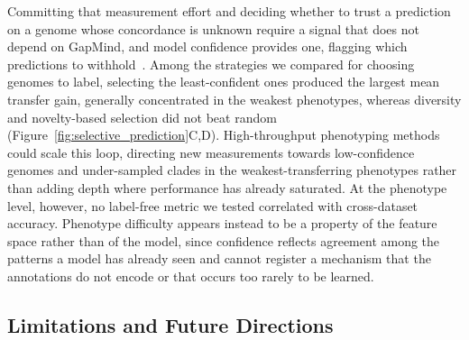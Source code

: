 Committing that measurement effort and deciding whether to trust a prediction on a genome whose concordance is unknown require a signal that does not depend on GapMind, and model confidence provides one, flagging which predictions to withhold~\cite{Weaver2008AppDomain,Geifman2017SelectiveClassification,Hendrickx2024Reject}.
Among the strategies we compared for choosing genomes to label, selecting the least-confident ones produced the largest mean transfer gain, generally concentrated in the weakest phenotypes, whereas diversity and novelty-based selection did not beat random (Figure~\ref{fig:selective_prediction}C,D).
High-throughput phenotyping methods~\cite{Nichols2011Landscape,Gralka2023-ft,Huang2023-lh,Kehe2019-vr} could scale this loop, directing new measurements towards low-confidence genomes and under-sampled clades in the weakest-transferring phenotypes rather than adding depth where performance has already saturated.
At the phenotype level, however, no label-free metric we tested correlated with cross-dataset accuracy.
Phenotype difficulty appears instead to be a property of the feature space rather than of the model, since confidence reflects agreement among the patterns a model has already seen and cannot register a mechanism that the annotations do not encode or that occurs too rarely to be learned.

\subsection*{Limitations and Future Directions}

